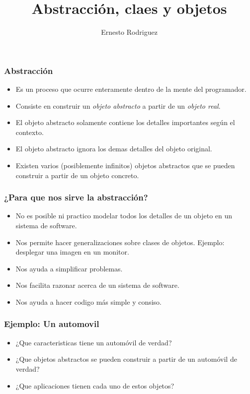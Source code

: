\documentclass{beamer}
\title[Git]{Abstracci\'on, claes y objetos}
\author{Ernesto Rodriguez}
\institute{
    Universidad del Itsmo \\
    \medskip \textit{erodriguez@unis.edu.gt}
}
\date[\today]{}
\begin{document}
\begin{frame}
\titlepage
\end{frame}

\begin{frame}
\frametitle{Abstracci\'on}
\begin{itemize}
    \item Es un proceso que ocurre enteramente dentro de la mente del programador.
    \item Consiste en construir un \emph{objeto abstracto} a partir de un \emph{objeto real}.
    \item El objeto abstracto solamente contiene los detalles importantes seg\'un el contexto.
    \item El objeto abstracto ignora los demas detalles del objeto original.
    \item Existen varios (posiblemente infinitos) objetos abstractos que se pueden construir a partir de un objeto concreto.
\end{itemize}
\end{frame}

\begin{frame}
    \frametitle{¿Para que nos sirve la abstracci\'on?}
    \begin{itemize}
        \item{No es posible ni practico modelar todos los detalles de un objeto en un sistema de software.}
        \item{Nos permite hacer generalizaciones sobre clases de objetos. Ejemplo: desplegar una imagen en un monitor.}
        \item{Nos ayuda a simplificar problemas.}
        \item{Nos facilita razonar acerca de un sistema de software.}
        \item{Nos ayuda a hacer codigo m\'as simple y consiso.}
    \end{itemize}
\end{frame}

\begin{frame}
    \frametitle{Ejemplo: Un automovil}
    \begin{itemize}
        \item{¿Que caracteristicas tiene un autom\'ovil de verdad?}
        \item{¿Que objetos abstractos se pueden construir a partir de un autom\'ovil de verdad?}
        \item{¿Que aplicaciones tienen cada uno de estos objetos?}
    \end{itemize}
\end{frame}
\end{document}
